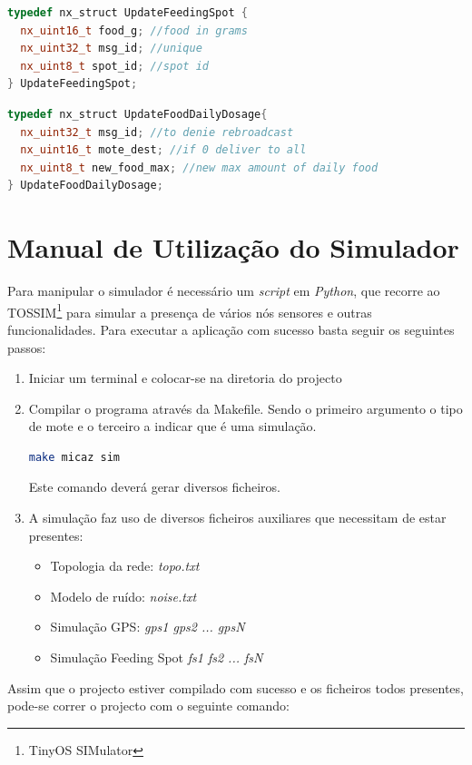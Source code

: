 \documentclass[times,10pt,twocolumn]{article}
\begin{document}
\begin{lstlisting}[language=c++]
typedef nx_struct UpdateFeedingSpot {
  nx_uint16_t food_g; //food in grams
  nx_uint32_t msg_id; //unique
  nx_uint8_t spot_id; //spot id
} UpdateFeedingSpot;
\end{lstlisting}

\begin{lstlisting}[language=c++]
typedef nx_struct UpdateFoodDailyDosage{
  nx_uint32_t msg_id; //to denie rebroadcast
  nx_uint16_t mote_dest; //if 0 deliver to all
  nx_uint8_t new_food_max; //new max amount of daily food 
} UpdateFoodDailyDosage;
\end{lstlisting}


\section{Manual de Utilização do Simulador}

Para manipular o simulador é necessário um \textit{script} em \textit{Python}, que recorre ao TOSSIM\footnote{TinyOS SIMulator} para simular a presença de vários nós sensores e outras funcionalidades. Para executar a aplicação com sucesso basta seguir os seguintes passos:

\begin{enumerate}
	\item Iniciar um terminal e colocar-se na diretoria do projecto
	\item Compilar o programa através da Makefile. Sendo o primeiro argumento o tipo de mote e o terceiro a indicar que é uma simulação.
	\begin{lstlisting}[language=bash]
make micaz sim
	\end{lstlisting}
	Este comando deverá gerar diversos ficheiros.
	\item A simulação faz uso de diversos ficheiros auxiliares que necessitam de estar presentes:
	\begin{itemize}
		\item Topologia da rede: \textit{topo.txt}
		\item Modelo de ruído: \textit{noise.txt}
		\item Simulação GPS: \textit{gps1 gps2 ... gpsN}
		\item Simulação Feeding Spot \textit{fs1 fs2 ... fsN}
	\end{itemize}
\end{enumerate}

Assim que o projecto estiver compilado com sucesso e os ficheiros todos presentes, pode-se correr o projecto com o seguinte comando:
\end{document}
